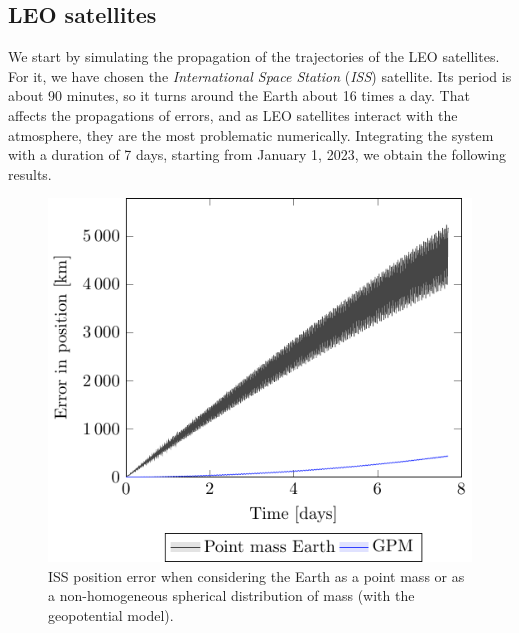\documentclass[../main.tex]{subfiles}
\begin{document}
\subsection{LEO satellites}
We start by simulating the propagation of the trajectories of the LEO satellites. For it, we have chosen the \emph{International Space Station} (\emph{ISS}) satellite. Its period is about 90 minutes, so it turns around the Earth about 16 times a day. That affects the propagations of errors, and as LEO satellites interact with the atmosphere, they are the most problematic numerically. Integrating the system with a duration of 7 days, starting from January 1, 2023, we obtain the following results.
\begin{figure}[htbp]
  \centering
  \begin{minipage}[ht]{0.45\textwidth}
    \centering
    \includegraphics[width=\textwidth]{Images/simulation/ISS_pointMass_comparison.pdf}
    \caption{ISS position error when considering the Earth as a point mass or as a non-homogeneous spherical distribution of mass (with the geopotential model).}
    \label{fig:ISS_point}
  \end{minipage}
  \hspace{0.0333333\textwidth}
  \begin{minipage}[ht]{0.45\textwidth}
    \centering

\end{minipage}
\end{figure}
\end{document}
